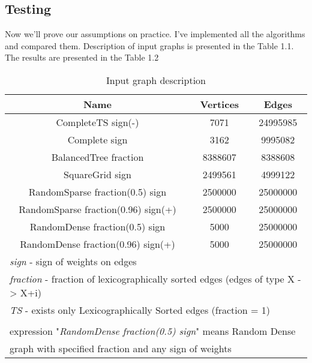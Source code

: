 \FloatBarrier
\subsection{Testing}

Now we'll prove our assumptions on practice. I've implemented all the algorithms and compared them. Description of input graphs is presented in the Table 1.1. The results are presented in the Table 1.2
\FloatBarrier

\begin{table}[H]
\centering

\begin{tabular}{c|c|c}  
Name & Vertices & Edges\\
\hline\hline
CompleteTS sign(-) & 7071 & 24995985 \\  
Complete sign & 3162 & 9995082  \\  
BalancedTree fraction & 8388607 & 8388608 \\  
SquareGrid sign & 2499561 & 4999122  \\  
RandomSparse fraction(0.5) sign & 2500000 & 25000000  \\  
RandomSparse fraction(0.96) sign(+) & 2500000 & 25000000  \\  
RandomDense fraction(0.5) sign & 5000 & 25000000  \\  
RandomDense fraction(0.96) sign(+) & 5000 & 25000000  \\  
\hline
\multicolumn{3}{l}{\footnotesize \textit{sign} - sign of weights on edges }\\
\multicolumn{3}{l}{\footnotesize \textit{fraction} - fraction of lexicographically sorted edges (edges of type X -> X+i) }\\
\multicolumn{3}{l}{\footnotesize \textit{TS} - exists only Lexicographically Sorted edges (fraction = 1) }\\
\multicolumn{3}{l}{\footnotesize }\\
\multicolumn{3}{l}{\footnotesize  expression "\textit{RandomDense fraction(0.5) sign}" means Random Dense }\\
\multicolumn{3}{l}{\footnotesize 	graph with specified fraction and any sign of weights}\\
\end{tabular}

\caption{Input graph description}
\label{bf_algo_comparison}
\end{table}
\FloatBarrier

